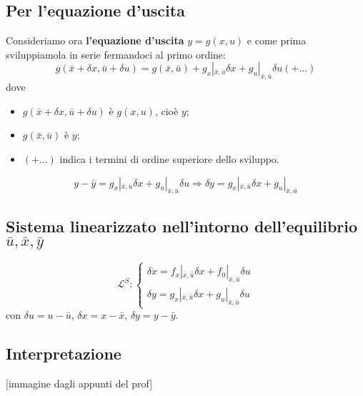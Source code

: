 \subsection{Per l'equazione d'uscita}
Consideriamo ora \textbf{l'equazione d'uscita} $y = g(x,u)$ e come prima sviluppiamola in serie fermandoci al primo ordine:
\[
    g(\bar{x} + \delta x , \bar{u} + \delta u) = g(\bar{x}, \bar{u}) + g_x|_{\bar{x}, \bar{u}} \delta x + g_u |_{\bar{x}, \bar{u}} \delta u (+ ...)
\]
dove
\begin{itemize}
    \item $g(\bar{x} + \delta x , \bar{u} + \delta u)$ è $g(x,u)$, cioè $y$;
    \item $g(\bar{x}, \bar{u})$ è $y$;
    \item $(+ ...)$ indica i termini di ordine superiore dello sviluppo.
\end{itemize}
\[
    y - \bar{y} = g_x|_{\bar{x}, \bar{u}} \delta x + g_u |_{\bar{x}, \bar{u}} \delta u \Longrightarrow \delta y = g_x|_{\bar{x}, \bar{u}} \delta x + g_u |_{\bar{x}, \bar{u}} 
\]
\subsection{Sistema linearizzato nell'intorno dell'equilibrio $\bar{u}, \bar{x}, \bar{y}$}
\[
    \mathcal{L}^S : \begin{cases}
        \delta \dot{x} = f_x |_{\bar{x},\bar{u}} \delta x + f_0|_{\bar{x},\bar{u}} \delta u\\
        \delta y = g_x|_{\bar{x},\bar{u}} \delta x + g_u |_{\bar{x},\bar{u}} \delta u
    \end{cases}
\]
con $ \delta u = u - \bar{u}$, $\delta x = x -\bar{x}$, $ \delta y = y - \bar{y}$.
\subsection{Interpretazione}
[immagine dagli appunti del prof]\newline
